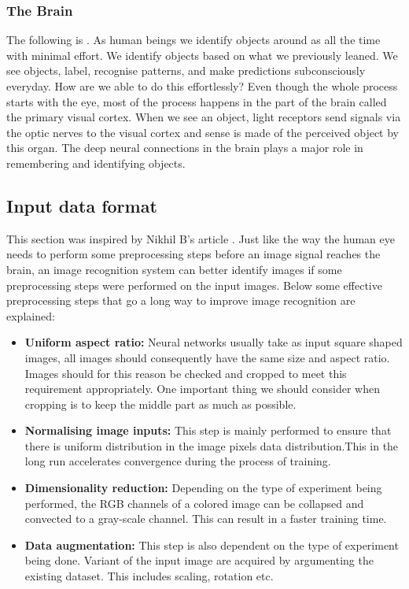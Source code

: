 \documentclass[12pt, a4paper,oneside]{report}
\begin{document}
\subsubsection{The Brain}
The following is . As human beings we identify objects around as all the time with minimal effort. We identify objects based on what we previously leaned. We see objects, label, recognise patterns, and make predictions subconsciously everyday. How are we able to do this effortlessly? Even though the whole process starts with the eye, most of the process happens in the part of the brain called the primary visual cortex. When we see an object, light receptors send signals via the optic nerves to the visual cortex and sense is made of the perceived object by this organ. The deep neural connections in the brain plays a major role in remembering and identifying objects.

\subsection{Input data format}
This section was inspired by Nikhil B's article \cite{input}. Just like the way the human eye needs to perform some preprocessing steps before an image signal reaches the brain, an image recognition system can better identify images if some preprocessing steps were performed on the input images. Below some effective preprocessing steps that go a long way to improve image recognition are explained:

\begin{itemize}
	
	\item \textbf{Uniform aspect ratio:}  Neural networks usually take as input square shaped images, all images should consequently have the same size and aspect ratio. Images should for this reason be checked and cropped to meet this requirement appropriately. One important thing we should consider when cropping is to keep the middle part as much as possible.
	
	\item \textbf{Normalising image inputs:} This step is mainly performed to ensure that there is uniform distribution in the image pixels data distribution.This in the long run accelerates convergence during the process of training. 

	\item \textbf{Dimensionality reduction:} Depending on the type of experiment being performed, the RGB channels of a colored image can be collapsed and convected to a gray-scale channel. This can result in a faster training time.
	
	\item \textbf{Data augmentation:} This step is also dependent on the type of experiment being done. Variant of the input image are acquired by argumenting the existing dataset. This includes scaling, rotation etc.
		
\end{itemize} 
\end{document}
